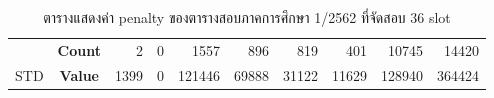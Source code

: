 \begin{table}[]
{\begin{tabular}{@{}ccrrrrrrrr@{}}
    {\color[HTML]{FE0000} }                      & {\color[HTML]{FE0000} \textbf{Count}} & {\color[HTML]{FE0000} 2}       & {\color[HTML]{FE0000} 0}       & {\color[HTML]{FE0000} 1557}    & {\color[HTML]{FE0000} 896}     & {\color[HTML]{FE0000} 819}     & {\color[HTML]{FE0000} 401}     & {\color[HTML]{FE0000} 10745}   & {\color[HTML]{FE0000} 14420}     \\ \cmidrule(l){2-10} 
    \multirow{-2}{*}{{\color[HTML]{FE0000} STD}} & {\color[HTML]{FE0000} \textbf{Value}} & {\color[HTML]{FE0000} 1399}    & {\color[HTML]{FE0000} 0}       & {\color[HTML]{FE0000} 121446}  & {\color[HTML]{FE0000} 69888}   & {\color[HTML]{FE0000} 31122}   & {\color[HTML]{FE0000} 11629}   & {\color[HTML]{FE0000} 128940}  & {\color[HTML]{FE0000} 364424}    \\ \bottomrule
    \end{tabular}%
    }
    \caption{ตารางแสดงค่า penalty ของตารางสอบภาคการศึกษา 1/2562 ที่จัดสอบ 36 slot}
    \label{tab:result_table_162_36}
\end{table}
